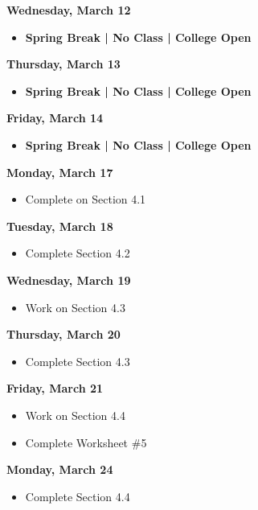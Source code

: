 \documentclass[11pt]{article}
\begin{document}
\textbf{Wednesday, March 12}

\begin{itemize}
\item \textbf{Spring Break | No Class | College Open}
\end{itemize}

\textbf{Thursday, March 13}

\begin{itemize}
\item \textbf{Spring Break | No Class | College Open}
\end{itemize}

\textbf{Friday, March 14}

\begin{itemize}
\item \textbf{Spring Break | No Class | College Open}
\end{itemize}

\textbf{Monday, March 17}

\begin{itemize}
\item Complete on Section 4.1
\end{itemize}

\textbf{Tuesday, March 18}

\begin{itemize}
\item Complete Section 4.2
\end{itemize}

\textbf{Wednesday, March 19}

\begin{itemize}
\item Work on Section 4.3
\end{itemize}

\textbf{Thursday, March 20}

\begin{itemize}
\item Complete Section 4.3
\end{itemize}

\textbf{Friday, March 21}

\begin{itemize}
\item Work on Section 4.4
\item Complete Worksheet \#5
\end{itemize}

\textbf{Monday, March 24}

\begin{itemize}
\item Complete Section 4.4
\end{itemize}
\end{document}
